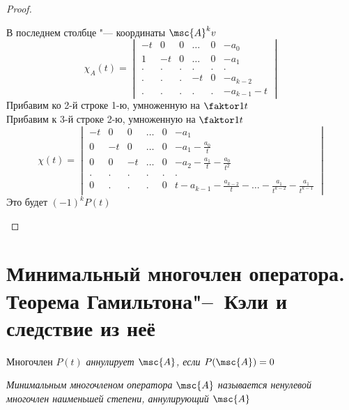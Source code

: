 \begin{proof}
\begin{itemize}
        В последнем столбце "--- координаты $ \msc{A}^kv $
        $$ \chi_A(t) =
        \begin{vmatrix}
            -t & 0 & 0 & \dots & 0 & -a_0 \\
            1 & -t & 0 & \dots & 0 & -a_1 \\
            . & . & . & . & . & . \\
            . & . & . & -t & 0 & -a_{k - 2} \\
            . & . & . & . & . & -a_{k - 1} - t
        \end{vmatrix} $$
        Прибавим ко 2-й строке 1-ю, умноженную на $ \faktor1t $ \\
        Прибавим к 3-й строке 2-ю, умноженную на $ \faktor1t $
        \widedots[10em]
        $$ \chi(t) =
        \begin{vmatrix}
            -t & 0 & 0 & \dots & 0 & -a_1 \\
            0 & -t & 0 & \dots & 0 & -a_1 - \frac{a_0}t \\
            0 & 0 & -t & \dots & 0 & -a_2 - \frac{a_1}t - \frac{a_0}{t^2} \\
            . & . & . & . & . & . \\
            0 & . & . & . & 0 & t - a_{k - 1} - \frac{a_{k -2}}t - \dots - \frac{a_1}{t^{k - 2}} - \frac{a_1}{t^{k - 1}}
        \end{vmatrix} $$
        Это будет $ (-1)^kP(t) $
    \end{itemize}
\end{proof}

\section{Минимальный многочлен оператора. Теорема Гамильтона\texorpdfstring{"--~}{--}Кэли и следствие из неё}

\begin{definition}
	Многочлен $ P(t) $ \it{аннулирует} $ \msc{A} $, если $ P(\msc{A}) = 0 $
\end{definition}

\begin{definition}
	\it{Минимальным многочленом} оператора $ \msc{A} $ называется ненулевой многочлен наименьшей степени, аннулирующий $ \msc{A} $
\end{definition}


